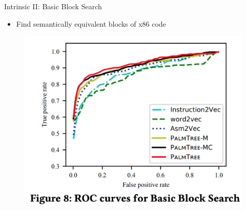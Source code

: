 \documentclass{beamer}
\begin{document}
\begin{frame}{Intrinsic II: Basic Block Search}
	
	\begin{itemize}
		\item Find semantically equivalent blocks of x86 code
	\end{itemize}
	
	\begin{figure}[h]
		\includegraphics[scale=.3]{images/basic-block-search.png}
	\end{figure}
	
\end{frame}
\end{document}
